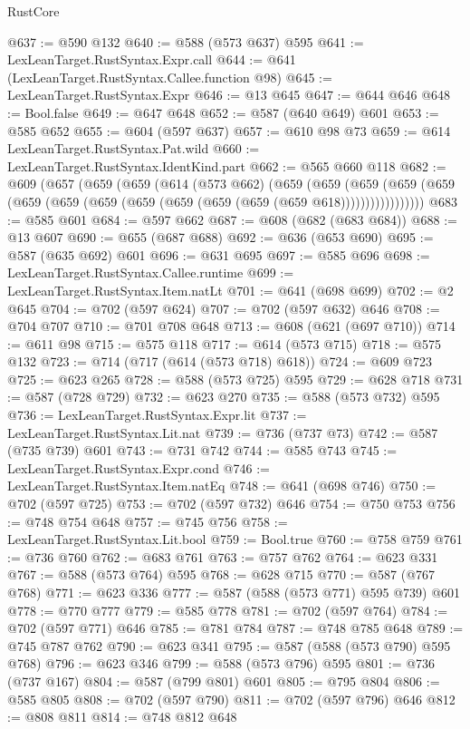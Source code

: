 \begin{lexlean}{RustCore}
\begin{coremodule}
@637 := @590 @132
@640 := @588 (@573 @637) @595
@641 := LexLeanTarget.RustSyntax.Expr.call
@644 := @641 (LexLeanTarget.RustSyntax.Callee.function @98)
@645 := LexLeanTarget.RustSyntax.Expr
@646 := @13 @645
@647 := @644 @646
@648 := Bool.false
@649 := @647 @648
@652 := @587 (@640 @649) @601
@653 := @585 @652
@655 := @604 (@597 @637)
@657 := @610 @98 @73
@659 := @614 LexLeanTarget.RustSyntax.Pat.wild
@660 := LexLeanTarget.RustSyntax.IdentKind.part
@662 := @565 @660 @118
@682 := @609
    (@657
      (@659
        (@659
          (@614
            (@573 @662)
            (@659
              (@659
                (@659
                  (@659 (@659 (@659 (@659 (@659 (@659 (@659 (@659 (@659 (@659 @618)))))))))))))))))
@683 := @585 @601
@684 := @597 @662
@687 := @608 (@682 (@683 @684))
@688 := @13 @607
@690 := @655 (@687 @688)
@692 := @636 (@653 @690)
@695 := @587 (@635 @692) @601
@696 := @631 @695
@697 := @585 @696
@698 := LexLeanTarget.RustSyntax.Callee.runtime
@699 := LexLeanTarget.RustSyntax.Item.natLt
@701 := @641 (@698 @699)
@702 := @2 @645
@704 := @702 (@597 @624)
@707 := @702 (@597 @632) @646
@708 := @704 @707
@710 := @701 @708 @648
@713 := @608 (@621 (@697 @710))
@714 := @611 @98
@715 := @575 @118
@717 := @614 (@573 @715)
@718 := @575 @132
@723 := @714 (@717 (@614 (@573 @718) @618))
@724 := @609 @723
@725 := @623 @265
@728 := @588 (@573 @725) @595
@729 := @628 @718
@731 := @587 (@728 @729)
@732 := @623 @270
@735 := @588 (@573 @732) @595
@736 := LexLeanTarget.RustSyntax.Expr.lit
@737 := LexLeanTarget.RustSyntax.Lit.nat
@739 := @736 (@737 @73)
@742 := @587 (@735 @739) @601
@743 := @731 @742
@744 := @585 @743
@745 := LexLeanTarget.RustSyntax.Expr.cond
@746 := LexLeanTarget.RustSyntax.Item.natEq
@748 := @641 (@698 @746)
@750 := @702 (@597 @725)
@753 := @702 (@597 @732) @646
@754 := @750 @753
@756 := @748 @754 @648
@757 := @745 @756
@758 := LexLeanTarget.RustSyntax.Lit.bool
@759 := Bool.true
@760 := @758 @759
@761 := @736 @760
@762 := @683 @761
@763 := @757 @762
@764 := @623 @331
@767 := @588 (@573 @764) @595
@768 := @628 @715
@770 := @587 (@767 @768)
@771 := @623 @336
@777 := @587 (@588 (@573 @771) @595 @739) @601
@778 := @770 @777
@779 := @585 @778
@781 := @702 (@597 @764)
@784 := @702 (@597 @771) @646
@785 := @781 @784
@787 := @748 @785 @648
@789 := @745 @787 @762
@790 := @623 @341
@795 := @587 (@588 (@573 @790) @595 @768)
@796 := @623 @346
@799 := @588 (@573 @796) @595
@801 := @736 (@737 @167)
@804 := @587 (@799 @801) @601
@805 := @795 @804
@806 := @585 @805
@808 := @702 (@597 @790)
@811 := @702 (@597 @796) @646
@812 := @808 @811
@814 := @748 @812 @648

\end{coremodule}
\end{lexlean}
